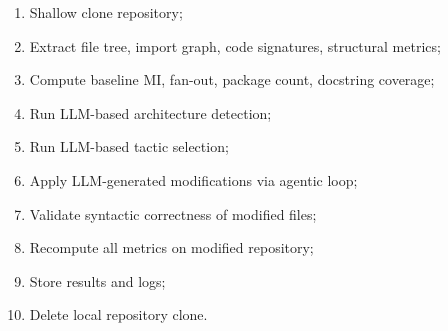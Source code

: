 \begin{enumerate}
    \item Shallow clone repository;
    \item Extract file tree, import graph, code signatures, structural metrics;
    \item Compute baseline MI, fan-out, package count, docstring coverage;
    \item Run LLM-based architecture detection;
    \item Run LLM-based tactic selection;
    \item Apply LLM-generated modifications via agentic loop;
    \item Validate syntactic correctness of modified files;
    \item Recompute all metrics on modified repository;
    \item Store results and logs;
    \item Delete local repository clone.
\end{enumerate}

